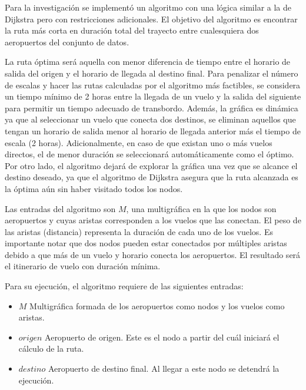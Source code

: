 Para la investigación se implementó un algoritmo con una lógica similar a la de Dijkstra pero con restricciones adicionales. El objetivo del algoritmo es encontrar la ruta más corta en duración total del trayecto entre cualesquiera dos aeropuertos del conjunto de datos.

La ruta óptima será aquella con menor diferencia de tiempo entre el horario de salida del origen y el horario de llegada al destino final. Para penalizar el número de escalas y hacer las rutas calculadas por el algoritmo más factibles, se considera un tiempo mínimo de 2 horas entre la llegada de un vuelo y la salida del siguiente para permitir un tiempo adecuado de transbordo. Además, la gráfica es dinámica ya que al seleccionar un vuelo que conecta dos destinos, se eliminan aquellos que tengan un horario de salida menor al horario de llegada anterior más el tiempo de escala (2 horas). Adicionalmente, en caso de que existan uno o más vuelos directos, el de menor duración se seleccionará automáticamente como el óptimo. Por otro lado, el algoritmo dejará de explorar la gráfica una vez que se alcance el destino deseado, ya que el algoritmo de Dijkstra asegura que la ruta alcanzada es la óptima aún sin haber visitado todos los nodos.

Las entradas del algoritmo son $M$, una multigráfica en la que los nodos son aeropuertos y cuyas aristas corresponden a los vuelos que las conectan. El peso de las aristas (distancia) representa la duración de cada uno de los vuelos. Es importante notar que dos nodos pueden estar conectados por múltiples aristas debido a que más de un vuelo y horario conecta los aeropuertos. El resultado será el itinerario de vuelo con duración mínima.

Para su ejecución, el algoritmo requiere de las siguientes entradas:

\begin{itemize}
	\item $M$ Multigráfica formada de los aeropuertos como nodos y los vuelos como aristas.
	\item $origen$ Aeropuerto de origen. Este es el nodo a partir del cuál iniciará el cálculo de la ruta.
	\item $destino$ Aeropuerto de destino final. Al llegar a este nodo se detendrá la ejecución.
\end{itemize}

